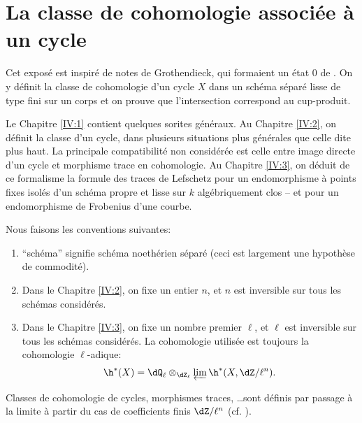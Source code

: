 \chapter{La classe de cohomologie associée à un cycle}\label{IV}




Cet exposé est inspiré de notes de Grothendieck, qui formaient un état 0 
de . On y définit la classe de cohomologie d'un cycle $X$ dans 
un schéma séparé lisse de type fini sur un corps et on prouve que 
l'intersection correspond au cup-produit.

Le Chapitre \ref{IV:1} contient quelques sorites généraux. Au Chapitre \ref{IV:2}, on 
définit la classe d'un cycle, dans plusieurs situations plus générales 
que celle dite plus haut. La principale compatibilité non considérée est 
celle entre image directe d'un cycle et morphisme trace en cohomologie. Au 
Chapitre \ref{IV:3}, on déduit de ce formalisme la formule des traces de Lefschetz pour 
un endomorphisme à points fixes isolés d'un schéma propre et lisse sur $k$ 
algébriquement clos -- et pour un endomorphisme de Frobenius d'une courbe. 

Nous faisons les conventions suivantes:
\begin{enumerate}[\indent 1)]
  \item ``schéma'' signifie schéma noethérien séparé (ceci est 
    largement une hypothèse de commodité).
  \item Dans le Chapitre \ref{IV:2}, on fixe un entier $n$, et $n$ est inversible sur 
    tous les schémas considérés.
  \item Dans le Chapitre \ref{IV:3}, on fixe un nombre premier $\ell$, et $\ell$ est 
    inversible sur tous les schémas considérés. La cohomologie utilisée 
    est toujours la cohomologie $\ell$-adique:
    \[
      \h^*(X) = \dQ_\ell\otimes_{\dZ_\ell} \varprojlim \h^*(X,\dZ/\ell^n) \text{.}
    \]
\end{enumerate}
Classes de cohomologie de cycles, morphismes traces, \ldots sont définis par 
passage à la limite à partir du cas de coefficients finis $\dZ/\ell^n$ (cf. 
).




















